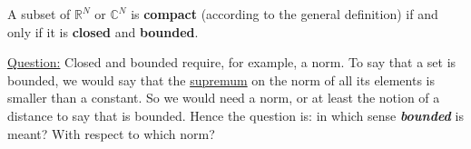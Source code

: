 \documentclass[../main.tex]{subfiles}
\begin{document}
\begin{theorem}
A subset of $\mathbb{R}^N$ or $\mathbb{C}^N$ is \textbf{compact} (according to the general definition)
 if and only if it is \textbf{closed} and \textbf{bounded}.
\end{theorem}
\underline{Question:} Closed and bounded require, for example, a norm. To say that a set is bounded, we would say that the \href{https://it.wikipedia.org/wiki/Estremo_superiore_e_estremo_inferiore}{supremum} on the norm of all its elements is smaller than a constant. So we would need a norm, or at least the notion of a distance to say that is bounded. Hence the question is: in which sense \textbf{\textit{bounded}} is meant? With respect to which norm?
\end{document}
